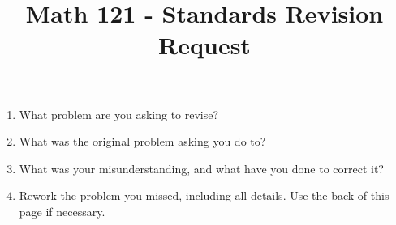 \documentclass[11pt]{article}
\title{Math 121 - Standards Revision Request}
\date{}
\begin{document}
\maketitle
\begin{enumerate}
\item What problem are you asking to revise?
\vspace{.5in}
\item What was the original problem asking you do to?
\vspace{1in}
\item What was your misunderstanding, and what have you done to correct it?
\vspace{2in}
\item Rework the problem you missed, including all details. Use the back of this page if necessary.
\end{enumerate}
\end{document}
